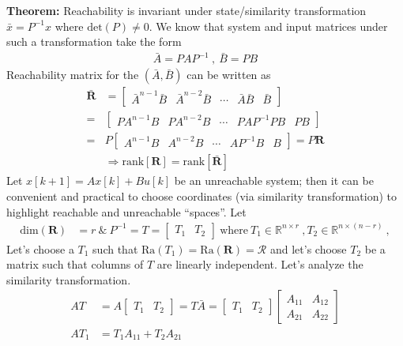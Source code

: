 \documentclass[twoside]{article}
\begin{document}
\textbf{Theorem:} Reachability is invariant under state/similarity transformation $\bar{x} = P^{-1} x$ where $\mathrm{det}(P) \neq 0$. 
We know that system and input matrices under such a transformation take the form
\begin{align*}
    \bar{A} = P A P^{-1} \ , \ \bar{B} = P B
\end{align*}
%
Reachability matrix for the $(\bar{A},\bar{B})$ can be written as
%
\begin{align*}
   \bar{\mathbf{R}} &= \left[ \begin{array}{c|c|c|c|c} \bar{A}^{n-1} \bar{B} & \bar{A}^{n-2} \bar{B} & \cdots & \bar{A} \bar{B} & \bar{B} \end{array} \right] 
   \\
    =& \left[ \begin{array}{c|c|c|c|c} P A^{n-1} B & P A^{n-2} B & \cdots & P A P^{-1} P B & P B \end{array} \right] 
    \\
    =& P \left[ \begin{array}{c|c|c|c|c} A^{n-1} B & A^{n-2} B & \cdots & A P^{-1} B & B \end{array} \right] = P \mathbf{R}
    \\
    &\Rightarrow \mathrm{rank} [ \mathbf{R} ] = \mathrm{rank} [ \mathbf{\bar{R}} ]
\end{align*}
%
Let $x[k+1] = A x[k] + B u[k]$ be an unreachable system; then it can be convenient and practical to choose coordinates (via similarity transformation)
to highlight reachable and unreachable ``spaces''. Let 
%
\begin{align*}
   \mathrm{dim}({\mathbf{R}}) &= r 
   \ \& \
   P^{-1} = T = \left[ \begin{array}{c|c} T_1 & T_2  \end{array} \right] \ \mathrm{where} \ T_1 \in \mathbb{R}^{n \times r} \ , 
   T_2 \in \mathbb{R}^{n \times (n-r)} \ , 
\end{align*}
%
Let's choose a $T_1$ such that $\mathrm{Ra}(T_1) = \mathrm{Ra}(\mathbf{R}) = \mathcal{R}$ and let's choose $T_2$ be a matrix such that 
columns of $T$ are linearly independent. Let's analyze the similarity transformation. 
%
%
\begin{align*}
    A T &=  A \left[ \begin{array}{c|c} T_1 & T_2  \end{array} \right] = T \bar{A} = \left[ \begin{array}{c|c} T_1 & T_2  \end{array} \right]
    \left[ \begin{array}{c|c} A_{11} & A_{12} \\ \hline A_{21} & A_{22}  \end{array} \right]
    \\
    A T_1 &= T_1 A_{11} + T_2 A_{21}
\end{align*}
\end{document}
